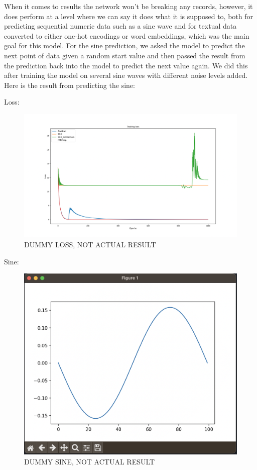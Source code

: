 \documentclass[12pt]{article}
\begin{document}
When it comes to results the network won't be breaking any records, however, it does perform at a level where we can say it does what it is supposed to, both for predicting sequential numeric data such as a sine wave and for textual data converted to either one-hot encodings or word embeddings, which was the main goal for this model. For the sine prediction, we asked the model to predict the next point of data given a random start value and then passed the result from the prediction back into the model to predict the next value again. We did this after training the model on several sine waves with different noise levels added. Here is the result from predicting the sine:

Loss:
\begin{figure}
    \centering
    \includegraphics[width = \textwidth]{texfiles/images/dummy_loss.png}
    \caption{DUMMY LOSS, NOT ACTUAL RESULT}
    \label{fig:enter-label}
\end{figure}

Sine:
\begin{figure}
    \centering
    \includegraphics[width = \textwidth]{texfiles/images/sine.png}
    \caption{DUMMY SINE, NOT ACTUAL RESULT}
    \label{fig:enter-label}
\end{figure}
\end{document}
